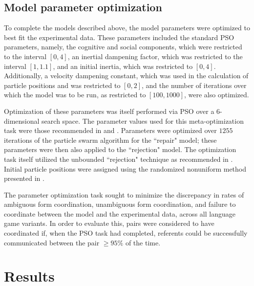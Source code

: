 \documentclass[12pt,a4paper]{article}
\begin{document}
\subsection{Model parameter optimization}
To complete the models described above, the model parameters were optimized to best fit the experimental data. These parameters included the standard PSO parameters, namely, the cognitive and social components, which were restricted to the interval $[0,4]$, an inertial dampening factor, which was restricted to the interval $[1,1.1]$, and an initial inertia, which was restricted to $[0,4]$. Additionally, a velocity dampening constant, which was used in the calculation of particle positions and was restricted to $[0,2]$, and the number of iterations over which the model was to be run, as restricted to $[100,1000]$, were also optimized.

Optimization of these parameters was itself performed via PSO over a $6$-dimensional search space. The parameter values used for this meta-optimization task were those recommended in \cite{shi1998} and \cite{solnon2010}. Parameters were optimized over $1255$ iterations of the particle swarm algorithm for the ``repair" model; these parameters were then also applied to the ``rejection" model. The optimization task itself utilized the unbounded ``rejection" technique as recommended in \cite{engelbrecht2005}. Initial particle positions were assigned using the randomized nonuniform method presented in \cite{mitchell1991}.

The parameter optimization task sought to minimize the discrepancy in rates of ambiguous form coordination, unambiguous form coordination, and failure to coordinate between the model and the experimental data, across all language game variants. In order to evaluate this, pairs were considered to have coordinated if, when the PSO task had completed, referents could be successfully communicated between the pair $\geq 95\%$ of the time.


\section{Results}
\end{document}
